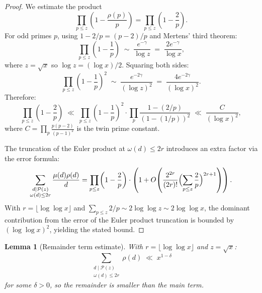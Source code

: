 \documentclass[12pt,a4paper]{amsart}
\newtheorem{lemma}[theorem]{Lemma}
\theoremstyle{definition}
\begin{document}
\begin{proof}
  We estimate the product
  \[
    \prod_{p \leq z} \left(1 - \frac{\rho(p)}{p}\right)
    = \prod_{p \leq z} \left(1 - \frac{2}{p}\right).
  \]
  For odd primes $p$, using $1 - 2/p = (p-2)/p$ and Mertens' third theorem:
  \[
    \prod_{p \leq z} \left(1 - \frac{1}{p}\right)
    \;\sim\; \frac{e^{-\gamma}}{\log z}
    \;=\; \frac{2e^{-\gamma}}{\log x},
  \]
  where $z = \sqrt{x}$ so $\log z = (\log x)/2$.  Squaring both sides:
  \[
    \prod_{p \leq z} \left(1 - \frac{1}{p}\right)^2
    \;\sim\; \frac{e^{-2\gamma}}{(\log z)^2}
    \;=\; \frac{4e^{-2\gamma}}{(\log x)^2}.
  \]
  Therefore:
  \[
    \prod_{p \leq z} \left(1 - \frac{2}{p}\right)
    \;\ll\; \prod_{p \leq z} \left(1 - \frac{1}{p}\right)^2
    \cdot \prod_p \frac{1-(2/p)}{(1-(1/p))^2}
    \;\ll\; \frac{C}{(\log x)^2},
  \]
  where $C = \prod_p \frac{p(p-2)}{(p-1)^2}$ is the twin prime constant.

  The truncation of the Euler product at $\omega(d) \leq 2r$ introduces an
  extra factor via the error formula:
  \[
    \sum_{\substack{d \mid \mathcal{P}(z)\\ \omega(d) \leq 2r}}
    \frac{\mu(d)\rho(d)}{d}
    = \prod_{p \leq z}\!\left(1-\frac{2}{p}\right)
      \cdot \left(1 + O\!\left(\frac{2^{2r}}{(2r)!}
        \Bigl(\sum_{p\leq z}\frac{2}{p}\Bigr)^{2r+1}\right)\right).
  \]
  With $r = \lfloor\log\log x\rfloor$ and $\sum_{p\leq z} 2/p \sim 2\log\log z
  \sim 2\log\log x$, the dominant contribution from the error of the Euler
  product truncation is bounded by $(\log\log x)^2$, yielding the stated bound.
\end{proof}

\begin{lemma}[Remainder term estimate]\label{lem:remainder}
  With $r = \lfloor\log\log x\rfloor$ and $z = \sqrt{x}$:
  \[
    \sum_{\substack{d \mid \mathcal{P}(z)\\ \omega(d)\leq 2r}} \rho(d)
    \;\ll\; x^{1-\delta}
  \]
  for some $\delta > 0$, so the remainder is smaller than the main term.
\end{lemma}
\end{document}
